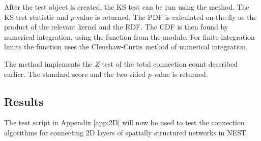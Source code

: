 After the test object is created, the KS test can be run using the  method. The KS test statistic and $p$-value is returned. The PDF is calculated on-the-fly as the product of the relevant kernel and the RDF. The CDF is then found by numerical integration, using the  function from the  module. For finite integration limits the function uses the Clenshaw-Curtis method of numerical integration. 

The method  implements the $Z$-test of the total connection count described earlier. The standard score and the two-sided $p$-value is returned.



\subsection{Results\label{subsec:2D_res}}

\graphicspath{{figs/spatial/2D_results/}}

The test script in Appendix \ref{app:2D} will now be used to test the connection algorithms for connecting 2D layers of spatially structured networks in NEST. 

